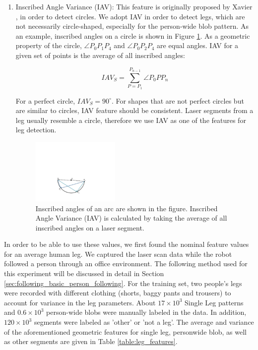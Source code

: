 \documentclass[12pt]{gatech-thesis}
\begin{document}
\begin{enumerate}
\item Inscribed Angle Variance (IAV): This feature is originally proposed by Xavier \cite{xavier2005fast}, in order to detect circles. We adopt IAV in order to detect legs, which are not necessarily circle-shaped, especially for the person-wide blob pattern. As an example, inscribed angles on a circle is shown in Figure \ref{fig:iav}. As a geometric property of the circle, $\angle P_0P_1P_4$ and $\angle P_0P_2P_4$ are equal angles. IAV for a given set of points is the average of all inscribed angles: 

\[
IAV_S = \sum_{P = P_1}^{P_{n-1}} \angle P_0PP_n
\]



For a perfect circle, $IAV_S=90^{\circ}$. For shapes that are not perfect circles but are similar to circles, IAV feature should be consistent. Laser segments from a leg usually resemble a circle, therefore we use IAV as one of the features for leg detection.

\begin{figure}[ht!]
\centering
\includegraphics[width=0.4\textwidth]{pics/iav}
\caption{Inscribed angles of an arc are shown in the figure. Inscribed Angle Variance (IAV) is calculated by taking the average of all inscribed angles on a laser segment.}
\label{fig:iav}
\end{figure}

\end{enumerate}

In order to be able to use these values, we first found the nominal feature values for an average human leg. We captured the laser scan data while the robot followed a person through an office environment. The following method used for this experiment will be discussed in detail in Section \ref{sec:following_basic_person_following}. For the training set, two people's legs were recorded with different clothing (shorts, baggy pants and trousers) to account for variance in the leg parameters. About $17\times 10^3$ Single Leg patterns and $0.6\times 10^3$ person-wide blobs were manually labeled in the data. In addition, $120\times 10^3$ segments were labeled as 'other' or 'not a leg'. The average and variance of the aforementioned geometric features for single leg, personwide blob, as well as other segments are given in Table \ref{table:leg_features}. 
\end{document}

